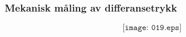 \documentclass[aspectratio=169,xcolor=dvipsnames]{beamer}
\begin{document}
%
%
%
%
%
%
\begin{frame}
	\frametitle{Mekanisk måling av differansetrykk}

	$$\texttt{[image: 019.eps]}$$
\end{frame}
\end{document}
